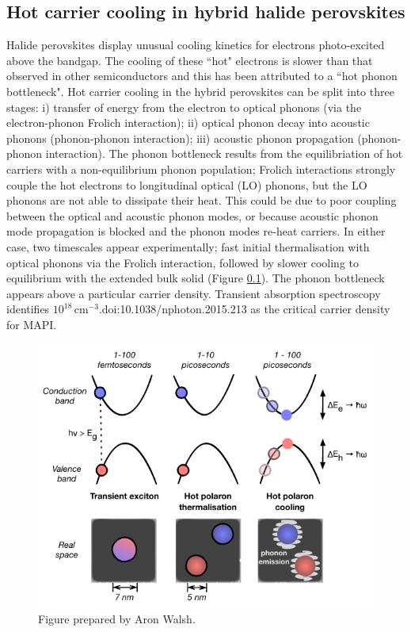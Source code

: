 \subsection{Hot carrier cooling in hybrid halide perovskites}

Halide perovskites display unusual cooling kinetics for electrons photo-excited above the bandgap.%
The cooling of these ``hot" electrons is slower than that observed in other semiconductors and this has been attributed to a ``hot phonon bottleneck".\cite{} %
Hot carrier cooling in the hybrid perovskites can be split into three stages: i) transfer of energy from the electron to optical phonons (via the electron-phonon Frolich interaction); ii) optical phonon decay into acoustic phonons (phonon-phonon interaction); iii) acoustic phonon propagation (phonon-phonon interaction).
The phonon bottleneck results from the equilibriation of hot carriers with a non-equilibrium phonon population;
Frolich interactions strongly couple the hot electrons to longitudinal optical (LO) phonons, but the LO phonons are not able to dissipate their heat. 
This could be due to poor coupling between the optical and acoustic phonon modes, or because acoustic phonon mode propagation is blocked and the phonon modes re-heat carriers.
In either case, two timescales appear experimentally; fast initial thermalisation with optical phonons via the Frolich interaction, followed by slower cooling to equilibrium with the extended bulk solid (Figure \ref{}).
The phonon bottleneck appears above a particular carrier density. Transient absorption spectroscopy identifies  $10^18\,\textrm{cm}^{-3}$.doi:10.1038/nphoton.2015.213 as the critical carrier density for MAPI.

\begin{figure}[h!]
\centering
  \includegraphics[width=0.7\columnwidth]{figures/ch5/f1.pdf}
  \caption[Hot carrier cooling model]{Figure prepared by Aron Walsh.}
\label{cooling_schematic}
\end{figure}

